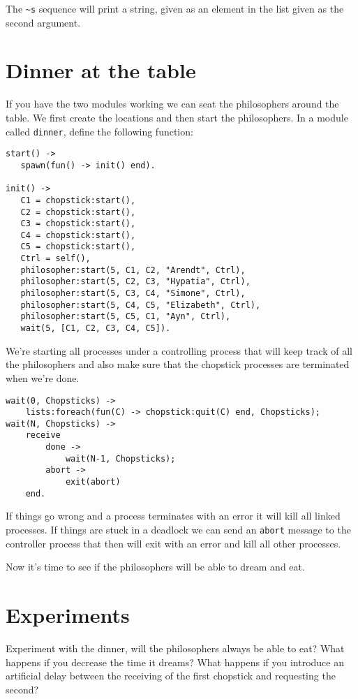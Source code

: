 \documentclass[a4paper,11pt]{article}
\begin{document}
The {\tt \textasciitilde s} sequence will print a string, given as an
element in the list given as the second argument.

\section{Dinner at the table}

If you have the two modules working we can seat the philosophers
around the table. We first create the locations and then start the
philosophers. In a module called {\tt dinner}, define the following
function:

\begin{verbatim}
start() ->
   spawn(fun() -> init() end).

init() ->
   C1 = chopstick:start(),
   C2 = chopstick:start(),
   C3 = chopstick:start(),
   C4 = chopstick:start(),
   C5 = chopstick:start(),
   Ctrl = self(),
   philosopher:start(5, C1, C2, "Arendt", Ctrl),
   philosopher:start(5, C2, C3, "Hypatia", Ctrl),
   philosopher:start(5, C3, C4, "Simone", Ctrl),
   philosopher:start(5, C4, C5, "Elizabeth", Ctrl),
   philosopher:start(5, C5, C1, "Ayn", Ctrl),
   wait(5, [C1, C2, C3, C4, C5]).
\end{verbatim}

We're starting all processes under a controlling process that will keep
track of all the philosophers and also make sure that the chopstick
processes are terminated when we're done. 

\begin{verbatim}
wait(0, Chopsticks) ->
    lists:foreach(fun(C) -> chopstick:quit(C) end, Chopsticks);
wait(N, Chopsticks) ->
    receive
        done ->
            wait(N-1, Chopsticks);
        abort ->
            exit(abort)
    end.
\end{verbatim}

If things go wrong and a process terminates with an error it will kill
all linked processes. If things are stuck in a deadlock we can send
an {\tt abort} message to the controller process that then will exit
with an error and kill all other processes.

Now it's time to see if the philosophers will be able to dream and eat. 

\section{Experiments}

Experiment with the dinner, will the philosophers always be able to
eat? What happens if you decrease the time it dreams? What happens if
you introduce an artificial delay between the receiving of the first
chopstick and requesting the second?
\end{document}
